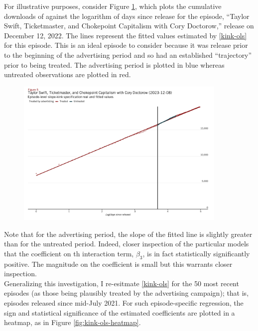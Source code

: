\documentclass[11pt, letterpaper, twoside]{article}
\begin{document}
For illustrative purposes, consider Figure \ref{fig:tswift_fitted}, which plots the cumulative downloads of against the logarithm of days since release for the episode, ``Taylor Swift, Ticketmaster, and Chokepoint Capitalism with Cory Doctorow,'' release on December 12, 2022. The lines represent the fitted values estimated by \eqref{kink-ols} for this episode. This is an ideal episode to consider because it was release prior to the beginning of the advertising period and so had an established ``trajectory'' prior to being treated. The advertising period is plotted in blue whereas untreated observations are plotted in red.\\
 
\begin{figure}[!htb]
  \centering
  \includegraphics[width=0.9\textwidth]{figures/tswift_daily_kink_plot.png}
  \caption{}
  \label{fig:tswift_fitted}
\end{figure}
  
Note that for the advertising period, the slope of the fitted line is slightly greater than for the untreated period. Indeed, closer inspection of the particular models that the coefficient on th  interaction term, $\beta_3$, is in fact statistically significantly positive. The magnitude on the coefficient is small but this warrants closer inspection.\\

Generalizing this investigation, I re-esitmate \eqref{kink-ols} for the 50 most recent episodes (as those being plausibly treated by the advertising campaign); that is, episodes released since mid-July 2021. For such episode-specific regression, the sign and statistical significance of the estimated coefficients are plotted in a heatmap, as in Figure \ref{fig:kink-ols-heatmap}.\\ 
\end{document}
